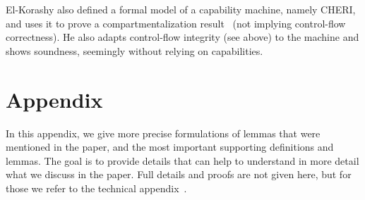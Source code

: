 \documentclass[format=acmsmall, review=true, screen=true]{acmart}
\begin{document}
El-Korashy also defined a formal model of a capability machine, namely CHERI,
and uses it to prove a compartmentalization
result~\citep{akram_el-korashy_formal_2016} (not implying control-flow
correctness). He also adapts control-flow integrity (see above) to the machine
and shows soundness, seemingly without relying on capabilities.







\appendix
\section{Appendix}
In this appendix, we give more precise formulations of lemmas that were mentioned in the paper, and the most important supporting definitions and lemmas.
The goal is to provide details that can help to understand in more detail what we discuss in the paper. 
Full details and proofs are not given here, but for those we refer to the technical appendix~\citep{technical_appendix}.
\end{document}
